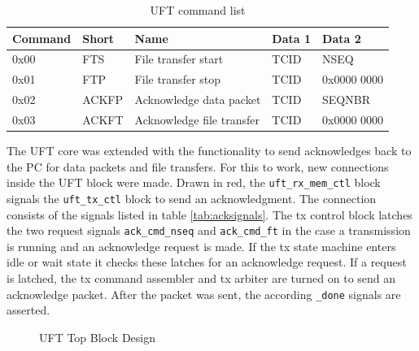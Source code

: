 \begin{table}[t!]
    \centering
    \begin{tabular}{l l l l l}
        \toprule
        Command & Short & Name & Data 1 & Data 2 \\
        \midrule
        0x00 & FTS & 
        File transfer start & TCID & NSEQ
        \\
        0x01 & FTP &
        File transfer stop & TCID & 0x0000 0000
        \\
        0x02 & ACKFP &
        Acknowledge data packet & TCID & SEQNBR
        \\
        0x03 & ACKFT &
        Acknowledge file transfer & TCID & 0x0000 0000
        \\
        \bottomrule
    \end{tabular}
    \caption{UFT command list}
    \label{tab:uftcommandlist}
\end{table}

The UFT core was extended with the functionality to send acknowledges back to
the PC for data packets and file transfers. For this to work, new connections
inside the UFT block were made. Drawn in red, the 
\texttt{uft\_rx\_mem\_ctl} block signals the \texttt{uft\_tx\_ctl} block to send
an acknowledgment. The connection consists of the signals listed in table 
\ref{tab:acksignals}. The tx control block latches the two request signals 
\texttt{ack\_cmd\_nseq} and \texttt{ack\_cmd\_ft} in the case a transmission is
running and an acknowledge request is made. If the tx state machine enters idle
or wait state it checks these latches for an acknowledge request. If a request
is latched, the tx command assembler and tx arbiter are turned on to send an
acknowledge packet. After the packet was sent, the according \texttt{\_done}
signals are asserted.


\begin{figure}[b!]
    \centering
    \begin{adjustbox}{max width=\textwidth}
        
    \end{adjustbox}
    \caption{UFT Top Block Design}
    \label{fig:ufttop}
\end{figure}


